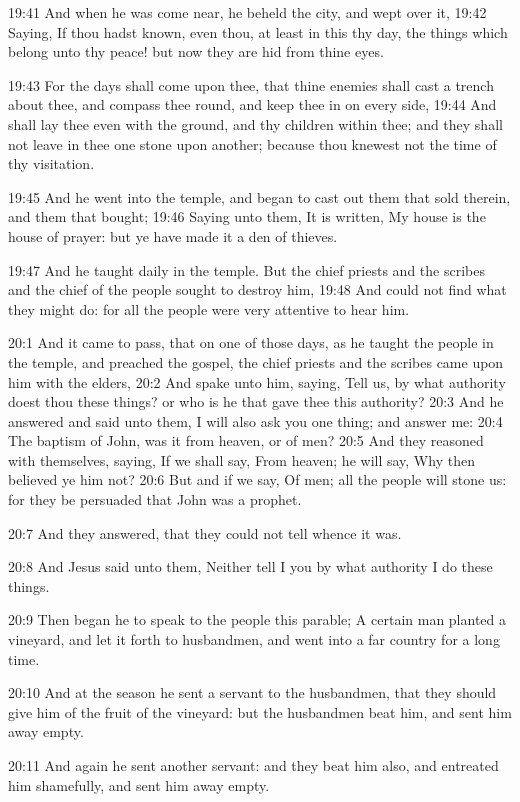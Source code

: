 19:41 And when he was come near, he beheld the city, and wept over it,
19:42 Saying, If thou hadst known, even thou, at least in this thy
day, the things which belong unto thy peace! but now they are hid from
thine eyes.

19:43 For the days shall come upon thee, that thine enemies shall cast
a trench about thee, and compass thee round, and keep thee in on every
side, 19:44 And shall lay thee even with the ground, and thy children
within thee; and they shall not leave in thee one stone upon another;
because thou knewest not the time of thy visitation.

19:45 And he went into the temple, and began to cast out them that
sold therein, and them that bought; 19:46 Saying unto them, It is
written, My house is the house of prayer: but ye have made it a den of
thieves.

19:47 And he taught daily in the temple. But the chief priests and the
scribes and the chief of the people sought to destroy him, 19:48 And
could not find what they might do: for all the people were very
attentive to hear him.

20:1 And it came to pass, that on one of those days, as he taught the
people in the temple, and preached the gospel, the chief priests and
the scribes came upon him with the elders, 20:2 And spake unto him,
saying, Tell us, by what authority doest thou these things? or who is
he that gave thee this authority?  20:3 And he answered and said unto
them, I will also ask you one thing; and answer me: 20:4 The baptism
of John, was it from heaven, or of men?  20:5 And they reasoned with
themselves, saying, If we shall say, From heaven; he will say, Why
then believed ye him not?  20:6 But and if we say, Of men; all the
people will stone us: for they be persuaded that John was a prophet.

20:7 And they answered, that they could not tell whence it was.

20:8 And Jesus said unto them, Neither tell I you by what authority I
do these things.

20:9 Then began he to speak to the people this parable; A certain man
planted a vineyard, and let it forth to husbandmen, and went into a
far country for a long time.

20:10 And at the season he sent a servant to the husbandmen, that they
should give him of the fruit of the vineyard: but the husbandmen beat
him, and sent him away empty.

20:11 And again he sent another servant: and they beat him also, and
entreated him shamefully, and sent him away empty.

